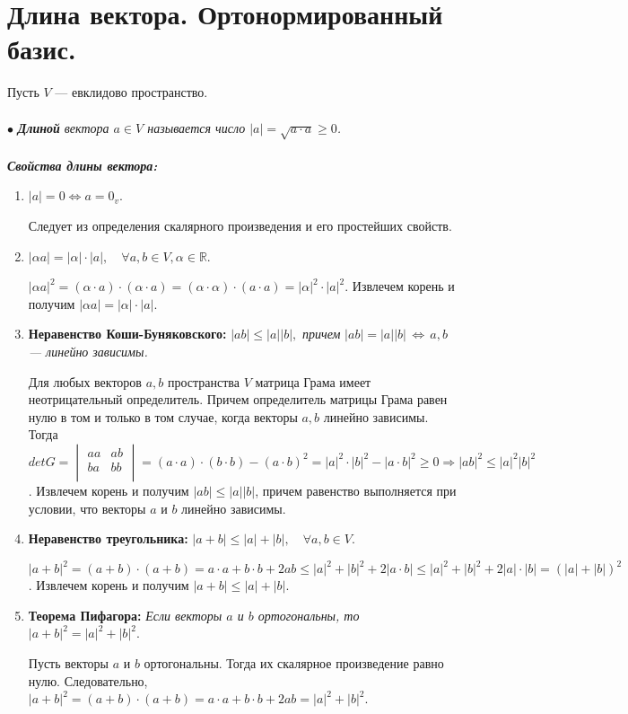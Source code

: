 \section{Длина вектора. Ортонормированный базис.}
Пусть $V$ --- евклидово пространство.\\\\ $\bullet$ \textit{\textbf{Длиной} вектора $a\in V$ называется число $|a|=\sqrt{a \cdot a}\geqslant0$.}\\\\
\textit{\textbf{Свойства длины вектора:}}\begin{enumerate}
	\item  $|a|=0 \Longleftrightarrow a=0_v$.
	\begin{Proof}
		Следует из определения скалярного произведения и его простейших
		свойств.
	\end{Proof}
	\item $|\alpha a|=|\alpha|\cdot |a|,\quad \forall a,b\in V, \alpha \in \mathbb{R}$.
	\begin{Proof}
		$|\alpha a|^2 = (\alpha\cdot a )\cdot(\alpha\cdot a) = (\alpha\cdot\alpha)\cdot(a\cdot a) = |\alpha|^2\cdot|a|^2$. Извлечем корень и получим $|\alpha a|=|\alpha|\cdot |a|$.
	\end{Proof}
	\item \textbf{Неравенство Коши-Буняковского:}
	$|ab| \leqslant |a||b|,$ \textit{причем} $|ab|=|a||b| \, \Longleftrightarrow \, a,b$\textit{ --- линейно зависимы.}
	\begin{Proof}
		Для любых векторов $a,b$ пространства $V$ матрица Грама имеет неотрицательный определитель. Причем определитель матрицы Грама равен нулю в том и только в том случае, когда векторы $a,b$ линейно зависимы. Тогда $detG=\begin{vmatrix}
			aa&ab\\
			ba&bb\\
		\end{vmatrix} = (a\cdot a)\cdot(b\cdot b)-(a\cdot b)^2=|a|^2\cdot |b|^2 - |a\cdot b|^2 \geqslant 0\Rightarrow |ab|^2\leqslant|a|^2|b|^2$. Извлечем корень и получим $|ab|\leqslant|a||b|$, причем равенство выполняется при условии, что векторы $a$ и $b$ линейно зависимы.
	\end{Proof}
	\item \textbf{Неравенство треугольника:}
	$|a+b| \leqslant |a|+|b|,\quad \forall a,b \in V$.\begin{Proof}
		$|a+b|^2=(a+b)\cdot(a+b)=a \cdot a+ b \cdot b + 2ab \leqslant |a|^2+|b|^2+2|a\cdot b| \leqslant |a|^2+|b|^2 + 2|a|\cdot|b| = (|a| + |b|)^2$. Извлечем корень и получим $|a+b| \leqslant |a|+|b|$.
	\end{Proof}
	\item \textbf{Теорема Пифагора:}
	\textit{Если векторы $a$ и $b$ ортогональны, то} $|a+b|^2=|a|^2+|b|^2$.\begin{Proof} Пусть векторы $a$ и $b$ ортогональны. Тогда их скалярное произведение равно нулю. Следовательно, $|a+b|^2=(a+b)\cdot(a+b)=a \cdot a + b \cdot b +2ab=|a|^2+|b|^2$.
	\end{Proof}
\end{enumerate}
